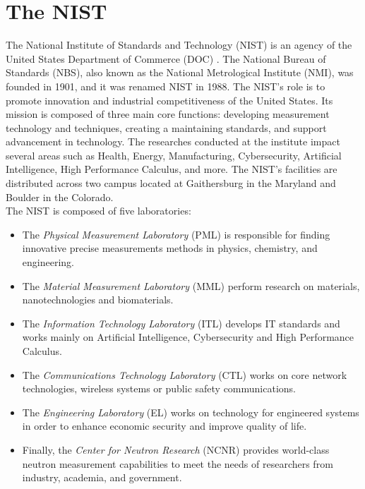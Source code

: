
\section{The NIST}

The National Institute of Standards and Technology (NIST) is an agency of the
United States Department of Commerce (DOC) \cite{enwiki:nist}. The National
Bureau of Standards (NBS), also known as the National Metrological Institute
(NMI), was founded in 1901, and it was renamed NIST in 1988. The NIST's role is
to promote innovation and industrial competitiveness of the United States. Its
mission is composed of three main core functions: developing measurement
technology and techniques, creating a maintaining standards, and support
advancement in technology. The researches conducted at the institute impact
several areas such as Health, Energy, Manufacturing, Cybersecurity, Artificial
Intelligence, High Performance Calculus, and more. The NIST's facilities are
distributed across two campus located at Gaithersburg in the Maryland and
Boulder in the Colorado.\\

The NIST is composed of five laboratories:

\begin{itemize}
  \item The \textit{Physical Measurement Laboratory} (PML) is responsible for
    finding innovative precise measurements methods in physics, chemistry, and
    engineering.

  \item The \textit{Material Measurement Laboratory} (MML) perform research on
    materials, nanotechnologies and biomaterials.

  \item The \textit{Information Technology Laboratory} (ITL) develops IT
    standards and works mainly on Artificial Intelligence, Cybersecurity and
    High Performance Calculus.

  \item The \textit{Communications Technology Laboratory} (CTL) works on core
    network technologies, wireless systems or public safety communications.

  \item The \textit{Engineering Laboratory} (EL) works on technology for
    engineered systems in order to enhance economic security and improve quality
    of life.

  \item Finally, the \textit{Center for Neutron Research} (NCNR) provides
    world-class neutron measurement capabilities to meet the needs of
    researchers from industry, academia, and government.
\end{itemize}

